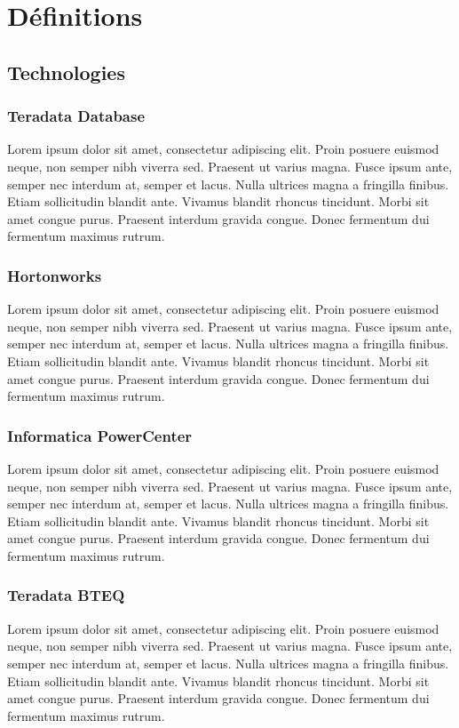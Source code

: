 
\chapter{Définitions}
\label{app:definitions}

\section{Technologies}
\subsection{Teradata Database} 
\label{app:teradata}

Lorem ipsum dolor sit amet, consectetur adipiscing elit. Proin posuere euismod neque, non semper nibh viverra sed. Praesent ut varius magna. Fusce ipsum ante, semper nec interdum at, semper et lacus. Nulla ultrices magna a fringilla finibus. Etiam sollicitudin blandit ante. Vivamus blandit rhoncus tincidunt. Morbi sit amet congue purus. Praesent interdum gravida congue. Donec fermentum dui fermentum maximus rutrum.

\subsection{Hortonworks} 
\label{app:hortonworks}
Lorem ipsum dolor sit amet, consectetur adipiscing elit. Proin posuere euismod neque, non semper nibh viverra sed. Praesent ut varius magna. Fusce ipsum ante, semper nec interdum at, semper et lacus. Nulla ultrices magna a fringilla finibus. Etiam sollicitudin blandit ante. Vivamus blandit rhoncus tincidunt. Morbi sit amet congue purus. Praesent interdum gravida congue. Donec fermentum dui fermentum maximus rutrum.

\subsection{Informatica PowerCenter} 
\label{app:informtica}
Lorem ipsum dolor sit amet, consectetur adipiscing elit. Proin posuere euismod neque, non semper nibh viverra sed. Praesent ut varius magna. Fusce ipsum ante, semper nec interdum at, semper et lacus. Nulla ultrices magna a fringilla finibus. Etiam sollicitudin blandit ante. Vivamus blandit rhoncus tincidunt. Morbi sit amet congue purus. Praesent interdum gravida congue. Donec fermentum dui fermentum maximus rutrum.

\subsection{Teradata BTEQ} 
\label{app:bteq}
Lorem ipsum dolor sit amet, consectetur adipiscing elit. Proin posuere euismod neque, non semper nibh viverra sed. Praesent ut varius magna. Fusce ipsum ante, semper nec interdum at, semper et lacus. Nulla ultrices magna a fringilla finibus. Etiam sollicitudin blandit ante. Vivamus blandit rhoncus tincidunt. Morbi sit amet congue purus. Praesent interdum gravida congue. Donec fermentum dui fermentum maximus rutrum.


